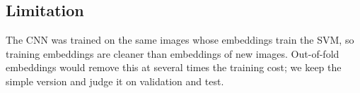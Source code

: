 \subsection{Limitation}
The CNN was trained on the same images whose embeddings train the SVM, so training embeddings are cleaner than
embeddings of new images. Out-of-fold embeddings would remove this at several times the training cost; we keep the
simple version and judge it on validation and test.
